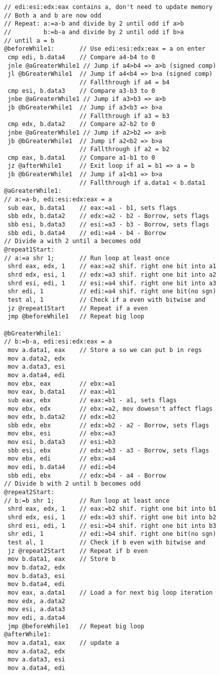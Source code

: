 \begin{multicols}{2}
{\begin{verbatim}
// edi:esi:edx:eax contains a, don't need to update memory
// Both a and b are now odd
// Repeat: a:=a-b and divide by 2 until odd if a>b
//         b:=b-a and divide by 2 until odd if b>a
// until a = b
@beforeWhile1:       // Use edi:esi:edx:eax = a on enter
 cmp edi, b.data4    // Compare a4-b4 to 0
 jnle @aGreaterWhile1 // Jump if a4>b4 => a>b (signed comp)
 jl @bGreaterWhile1  // Jump if a4<b4 => b>a (signed comp)
                     // Fallthrough if a4 = b4
 cmp esi, b.data3    // Compare a3-b3 to 0
 jnbe @aGreaterWhile1 // Jump if a3>b3 => a>b
 jb @bGreaterWhile1  // Jump if a3<b3 => b>a
                     // Fallthrough if a3 = b3
 cmp edx, b.data2    // Compare a2-b2 to 0
 jnbe @aGreaterWhile1 // Jump if a2>b2 => a>b
 jb @bGreaterWhile1  // Jump if a2<b2 => b>a
                     // Fallthrough if a2 = b2
 cmp eax, b.data1    // Compare a1-b1 to 0
 jz @afterWhile1     // Exit loop if a1 = b1 => a = b
 jb @bGreaterWhile1  // Jump if a1<b1 => b>a
                     // Fallthrough if a.data1 < b.data1
@aGreaterWhile1:
// a:=a-b, edi:esi:edx:eax = a
 sub eax, b.data1    // eax:=a1 - b1, sets flags
 sbb edx, b.data2    // edx:=a2 - b2 - Borrow, sets flags
 sbb esi, b.data3    // esi:=a3 - b3 - Borrow, sets flags
 sbb edi, b.data4    // edi:=a4 - b4 - Borrow
// Divide a with 2 until a becomes odd
@repeat1Start:
// a:=a shr 1;       // Run loop at least once
 shrd eax, edx, 1    // eax:=a2 shif. right one bit into a1
 shrd edx, esi, 1    // edx:=a3 shif. right one bit into a2
 shrd esi, edi, 1    // esi:=a4 shif. right one bit into a3
 shr edi, 1          // edi:=a4 shif. right one bit(no sgn)
 test al, 1          // Check if a even with bitwise and
 jz @repeat1Start    // Repeat if a even
 jmp @beforeWhile1   // Repeat big loop

@bGreaterWhile1:
// b:=b-a, edi:esi:edx:eax = a
 mov a.data1, eax    // Store a so we can put b in regs
 mov a.data2, edx
 mov a.data3, esi
 mov a.data4, edi
 mov ebx, eax        // ebx:=a1
 mov eax, b.data1    // eax:=b1
 sub eax, ebx        // eax:=b1 - a1, sets flags
 mov ebx, edx        // ebx:=a2, mov dowesn't affect flags
 mov edx, b.data2    // edx:=b2
 sbb edx, ebx        // edx:=b2 - a2 - Borrow, sets flags
 mov ebx, esi        // ebx:=a3
 mov esi, b.data3    // esi:=b3
 sbb esi, ebx        // edx:=b3 - a3 - Borrow, sets flags
 mov ebx, edi        // ebx:=a4
 mov edi, b.data4    // edi:=b4
 sbb edi, ebx        // edx:=b4 - a4 - Borrow
// Divide b with 2 until b becomes odd
@repeat2Start:
// b:=b shr 1;       // Run loop at least once
 shrd eax, edx, 1    // eax:=b2 shif. right one bit into b1
 shrd edx, esi, 1    // edx:=b3 shif. right one bit into b2
 shrd esi, edi, 1    // esi:=b4 shif. right one bit into b3
 shr edi, 1          // edi:=b4 shif. right one bit(no sgn)
 test al, 1          // Check if b even with bitwise and
 jz @repeat2Start    // Repeat if b even
 mov b.data1, eax    // Store b
 mov b.data2, edx
 mov b.data3, esi
 mov b.data4, edi
 mov eax, a.data1    // Load a for next big loop iteration
 mov edx, a.data2
 mov esi, a.data3
 mov edi, a.data4
 jmp @beforeWhile1   // Repeat big loop
@afterWhile1:
 mov a.data1, eax    // update a
 mov a.data2, edx
 mov a.data3, esi
 mov a.data4, edi


\end{verbatim}}
\end{multicols}
